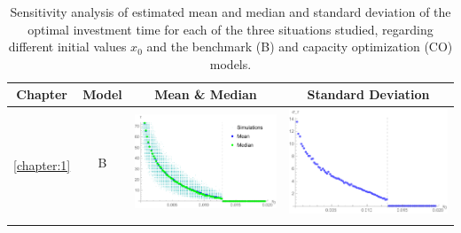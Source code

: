 \begin{table}[!htb]
	\caption{Sensitivity analysis of estimated mean and median and standard deviation of the optimal investment time for each of the three situations studied, regarding different initial values $x_0$ and the benchmark (B) and capacity optimization (CO) models.}
	\centering
	\begin{tabular}{c|c|c|c}
		\hline
		Chapter & Model & Mean \& Median & Standard Deviation \\ \hline
		\multirow{11}{*}{\ref{chapter:1}} & B & 
		\begin{minipage}{.4\textwidth}
			\includegraphics[width=\linewidth]{StopTime/1_BMtau.pdf}
		\end{minipage}
		& \begin{minipage}{.4\textwidth}
			\includegraphics[width=\linewidth]{StopTime/1_BMsd.pdf}
		\end{minipage} 
	\\ \cline{2-4} 

\end{tabular}
\end{table}
